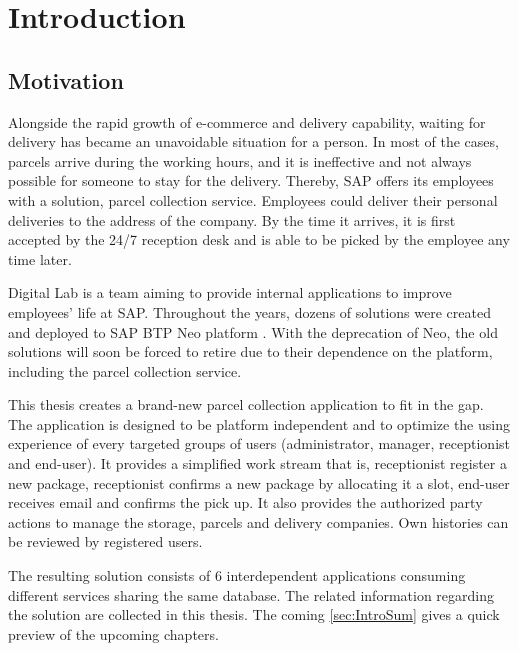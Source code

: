 \chapter{Introduction}
\label{ch:intro}

\section{Motivation}
Alongside the rapid growth of e-commerce and delivery capability, waiting for delivery has became an unavoidable situation for a person. In most of the cases, parcels arrive during the working hours, and it is ineffective and not always possible for someone to stay for the delivery. Thereby, SAP offers its employees with a solution, parcel collection service. Employees could deliver their personal deliveries to the address of the company. By the time it arrives, it is first accepted by the 24/7 reception desk and is able to be picked by the employee any time later.

Digital Lab is a team aiming to provide internal applications to improve employees' life at SAP. Throughout the years, dozens of solutions were created and deployed to SAP BTP \cite{btp} Neo platform \cite{neo}. With the deprecation of Neo, the old solutions will soon be forced to retire due to their dependence on the platform, including the parcel collection service.

This thesis creates a brand-new parcel collection application to fit in the gap. The application is designed to be platform independent and to optimize the using experience of every targeted groups of users (administrator, manager, receptionist and end-user). It provides a simplified work stream that is, receptionist register a new package, receptionist confirms a new package by allocating it a slot, end-user receives email and confirms the pick up. It also provides the authorized party actions to manage the storage, parcels and delivery companies. Own histories can be reviewed by registered users.

The resulting solution consists of 6 interdependent applications consuming different services sharing the same database. The related information regarding the solution are collected in this thesis. The coming \autoref{sec:IntroSum} gives a quick preview of the upcoming chapters.



